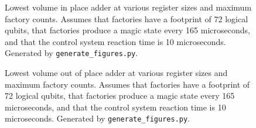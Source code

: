 \documentclass[onecolumn,unpublished]{quantumarticle}
\theoremstyle{definition}
\theoremstyle{definition}
\theoremstyle{definition}
\begin{document}
\begin{figure}[H]
    \centering
    \caption{
        Lowest volume in place adder at various register sizes and maximum factory counts.
        Assumes that factories have a footprint of 72 logical qubits, that factories produce a magic state every 165 microseconds, and that the control system reaction time is 10 microseconds.
        Generated by \texttt{generate\_figures.py}.
    }
    \label{fig:minif}
\end{figure}

\begin{figure}[H]
    \centering
    \caption{
        Lowest volume out of place adder at various register sizes and maximum factory counts.
        Assumes that factories have a footprint of 72 logical qubits, that factories produce a magic state every 165 microseconds, and that the control system reaction time is 10 microseconds.
        Generated by \texttt{generate\_figures.py}.
    }
    \label{fig:minof}
\end{figure}
\end{document}
